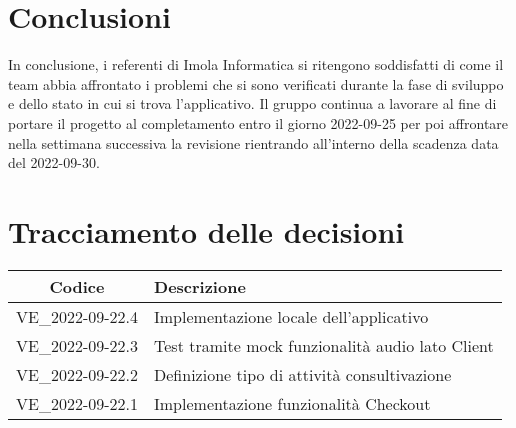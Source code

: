 \section{Conclusioni}
In conclusione, i referenti di Imola Informatica si ritengono soddisfatti di come il team abbia affrontato i problemi che si sono verificati durante la fase di sviluppo e dello stato in cui si trova l'applicativo. Il gruppo continua a lavorare al fine di portare il progetto al completamento entro il giorno 2022-09-25 per poi affrontare nella settimana successiva la revisione  rientrando all'interno della scadenza data del 2022-09-30. 
\newpage

\section*{Tracciamento delle decisioni}
	\renewcommand{\arraystretch}{1.8} %
	\begin{tabular}{ |c|l| }
		\hline
		\textbf{Codice} & \textbf{Descrizione} \\
		\hline
		VE\_2022-09-22.4 & Implementazione locale dell'applicativo \\
		\hline
		VE\_2022-09-22.3 & Test tramite mock funzionalità audio lato Client\\
		\hline
		VE\_2022-09-22.2 & Definizione tipo di attività consultivazione\\
		\hline
		VE\_2022-09-22.1 & Implementazione funzionalità Checkout\\
		\hline
	\end{tabular}